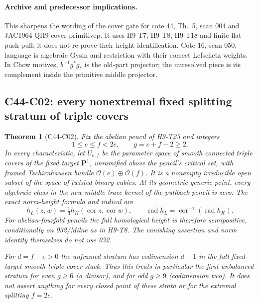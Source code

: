 \documentclass[11pt]{article}
\newtheorem{theorem}{Theorem}[section]
\theoremstyle{remark}\newtheorem{remark}[theorem]{Remark}
\begin{document}
\paragraph{Archive and predecessor implications.}
This sharpens the wording of the cover gate for cote 44, Th.~5,
scan 004 and JAC1964 QH9-cover-primitivep. It uses H9-T7, H9-T8,
H9-T18 and finite-flat push-pull; it does not re-prove their height
identification. Cote 16, scan 050, language is algebraic Gysin and
restriction with their correct Lefschetz weights. In Chow motives,
$b^{-1}g^*g_*$ is the old-part projector; the unresolved piece is its
complement inside the primitive middle projector.

\subsection{C44-C02: every nonextremal fixed splitting stratum of triple covers}
\begin{theorem}[C44-C02]\label{thm:maroni}
Fix the abelian pencil of H9-T23 and integers
\[
                  1\le e\le f<2e,
                  \qquad g=e+f-2\ge2.
\]
In every characteristic, let $U_{e,f}$ be the parameter space of smooth
connected triple covers of the fixed target $\mathbf P^1$, unramified
above the pencil's critical set, with framed Tschirnhausen bundle
$\mathcal O(e)\oplus\mathcal O(f)$. It is a nonempty irreducible open
subset of the space of twisted binary cubics. At its geometric generic
point, every algebraic class in the new middle trace kernel of the
pullback pencil is zero. The exact norm-height formula and radical are
\[
 h_L(z,w)=\tfrac13h_K(\operatorname{cor}z,\operatorname{cor}w),
 \qquad \operatorname{rad}h_L=
       \operatorname{cor}^{-1}(\operatorname{rad}h_K).       \tag{C44.C02.1}
\]
For abelian-fourfold pencils the full homological height is therefore
semipositive, conditionally on 032/Milne as in H9-T8. The vanishing
assertion and norm identity themselves do not use 032.

For $d=f-e>0$ the unframed stratum has codimension $d-1$ in the full
fixed-target smooth triple-cover stack. Thus this treats in particular
the first unbalanced stratum for even $g\ge6$ (a divisor), and for odd
$g\ge9$ (codimension two). It does not assert anything for every closed
point of these strata or for the extremal splitting $f=2e$.
\end{theorem}
\end{document}
